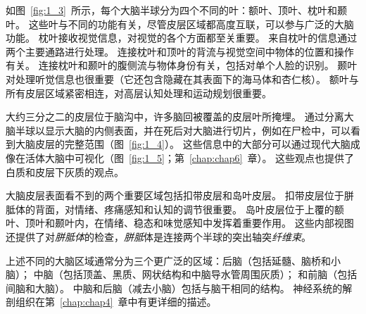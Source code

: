 \begin{proposition}[中枢神经系统的解剖学组织]
	\quad \quad 如图~\ref{fig:1_3}~所示，每个大脑半球分为四个不同的叶：额叶、顶叶、枕叶和颞叶。
	这些叶与不同的功能有关，尽管皮层区域都高度互联，可以参与广泛的大脑功能。
	枕叶接收视觉信息，对视觉的各个方面都至关重要。
	来自枕叶的信息通过两个主要通路进行处理。
	连接枕叶和顶叶的背流与视觉空间中物体的位置和操作有关。
	连接枕叶和颞叶的腹侧流与物体身份有关，包括对单个人脸的识别。
	颞叶对处理听觉信息也很重要（它还包含隐藏在其表面下的海马体和杏仁核）。
	额叶与所有皮层区域紧密相连，对高层认知处理和运动规划很重要。
	
	\quad \quad 大约三分之二的皮层位于脑沟中，许多脑回被覆盖的皮层叶所掩埋。
	通过分离大脑半球以显示大脑的内侧表面，并在死后对大脑进行切片，例如在尸检中，可以看到大脑皮层的完整范围（图~\ref{fig:1_4}）。
	这些信息中的大部分可以通过现代大脑成像在活体大脑中可视化（图~\ref{fig:1_5}；第~\ref{chap:chap6}~章）。
	这些观点也提供了白质和皮层下灰质的观点。
	
	\quad \quad 大脑皮层表面看不到的两个重要区域包括扣带皮层和岛叶皮层。
	扣带皮层位于胼胝体的背面，对情绪、疼痛感知和认知的调节很重要。
	岛叶皮层位于上覆的额叶、顶叶和颞叶内，在情绪、稳态和味觉感知中发挥着重要作用。
	这些内部视图还提供了对\textit{胼胝体}的检查，\textit{胼胝}体是连接两个半球的突出轴突\textit{纤维束}。
	
	上述不同的大脑区域通常分为三个更广泛的区域：后脑（包括延髓、脑桥和小脑）；
	中脑（包括顶盖、黑质、网状结构和中脑导水管周围灰质）；
	和前脑（包括间脑和大脑）。
	中脑和后脑（减去小脑）包括与脑干相同的结构。
	神经系统的解剖组织在第~\ref{chap:chap4}~章中有更详细的描述。
		
\end{proposition}


